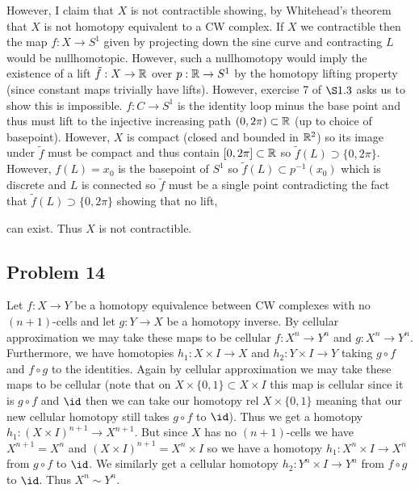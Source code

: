 \documentclass[12pt]{extarticle}
\begin{document}
However, I claim that $X$ is not contractible showing, by Whitehead's theorem that $X$ is not homotopy equivalent to a CW complex. If $X$ we contractible then the map $f : X \to S^1$ given by projecting down the sine curve and contracting $L$ would be nullhomotopic. However, such a nullhomotopy would imply the existence of a lift $\tilde{f} : X \to \mathbb{R}$ over $p : \mathbb{R} \to S^1$ by the homotopy lifting property (since constant maps trivially have lifts). However, exercise 7 of $\S 1.3$ asks us to show this is impossible. $f : C \to S^1$ is the identity loop minus the base point and thus must lift to the injective increasing path $(0, 2\pi) \subset \mathbb{R}$ (up to choice of basepoint). However, $X$ is compact (closed and bounded in $\mathbb{R}^2$) so its image under $\tilde{f}$ must be compact and thus contain $[0, 2\pi] \subset \mathbb{R}$ so $\tilde{f}(L) \supset \{ 0, 2 \pi \}$. However, $f(L) = x_0$ is the basepoint of $S^1$ so $\tilde{f}(L) \subset p^{-1}(x_0)$ which is discrete and $L$ is connected so $\tilde{f}$ must be a single point contradicting the fact that $\tilde{f}(L) \supset \{ 0, 2 \pi \}$ showing that no lift,
\begin{center}
\end{center}
can exist. Thus $X$ is not contractible. 

\subsection{Problem 14}

Let $f : X \to Y$ be a homotopy equivalence between CW complexes with no $(n+1)$-cells and let $g : Y \to X$ be a homotopy inverse. By cellular approximation we may take these maps to be cellular $f : X^n \to Y^n$ and $g : X^n \to Y^n$. Furthermore, we have homotopies $h_1 : X \times I \to X$ and $h_2 : Y \times I \to Y$ taking $g \circ f$ and $f \circ g$ to the identities. Again by cellular approximation we may take these maps to be cellular (note that on $X \times \{ 0, 1 \} \subset X \times I$ this map is cellular since it is $g \circ f$ and $\id$ then we can take our homotopy rel $X \times \{ 0, 1 \}$ meaning that our new cellular homotopy still takes $g \circ f$ to $\id$). Thus we get a homotopy $h_1 : (X \times I)^{n+1} \to X^{n+1}$. But since $X$ has no $(n + 1)$-cells we have $X^{n+1} = X^n$ and $(X \times I)^{n+1} = X^n \times I$ so we have a homotopy $h_1 : X^n \times I \to X^n$ from $g \circ f$ to $\id$. We similarly get a cellular homotopy $h_2 : Y^n \times I \to Y^n$ from $f \circ g$ to $\id$. Thus $X^n \sim Y^n$. 
\end{document}
